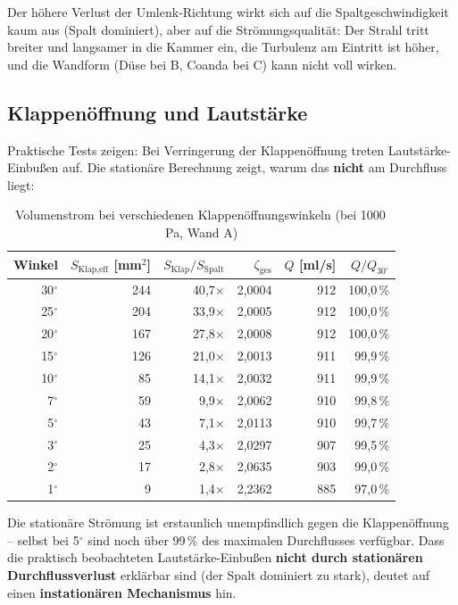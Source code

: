 \documentclass[11pt,a4paper]{article}
\begin{document}
Der höhere Verlust der Umlenk-Richtung wirkt sich auf die Spaltgeschwindigkeit kaum aus (Spalt dominiert), aber auf die Strömungsqualität: Der Strahl tritt breiter und langsamer in die Kammer ein, die Turbulenz am Eintritt ist höher, und die Wandform (Düse bei B, Coanda bei C) kann nicht voll wirken.

\subsection{Klappenöffnung und Lautstärke}

Praktische Tests zeigen: Bei Verringerung der Klappenöffnung treten Lautstärke-Einbußen auf. Die stationäre Berechnung zeigt, warum das \textbf{nicht} am Durchfluss liegt:

\begin{table}[H]
\centering\small
\begin{tabular}{r r r r r r}
\toprule
\textbf{Winkel} & $S_\text{Klap,eff}$ [mm$^2$] & $S_\text{Klap}/S_\text{Spalt}$ & $\zeta_\text{ges}$ & $Q$ [ml/s] & $Q/Q_{30^\circ}$ \\
\midrule
30${}^\circ$ & 244 & 40{,}7$\times$ & 2{,}0004 & 912 & 100{,}0\,\% \\
25${}^\circ$ & 204 & 33{,}9$\times$ & 2{,}0005 & 912 & 100{,}0\,\% \\
20${}^\circ$ & 167 & 27{,}8$\times$ & 2{,}0008 & 912 & 100{,}0\,\% \\
15${}^\circ$ & 126 & 21{,}0$\times$ & 2{,}0013 & 911 & 99{,}9\,\% \\
10${}^\circ$ & 85 & 14{,}1$\times$ & 2{,}0032 & 911 & 99{,}9\,\% \\
7${}^\circ$ & 59 & 9{,}9$\times$ & 2{,}0062 & 910 & 99{,}8\,\% \\
5${}^\circ$ & 43 & 7{,}1$\times$ & 2{,}0113 & 910 & 99{,}7\,\% \\
3${}^\circ$ & 25 & 4{,}3$\times$ & 2{,}0297 & 907 & 99{,}5\,\% \\
2${}^\circ$ & 17 & 2{,}8$\times$ & 2{,}0635 & 903 & 99{,}0\,\% \\
1${}^\circ$ & 9 & 1{,}4$\times$ & 2{,}2362 & 885 & 97{,}0\,\% \\
\bottomrule
\end{tabular}
\caption{Volumenstrom bei verschiedenen Klappenöffnungswinkeln (bei 1000\,Pa, Wand A)}
\end{table}

\begin{warnbox}
Die stationäre Strömung ist erstaunlich unempfindlich gegen die Klappenöffnung -- selbst bei 5${}^\circ$ sind noch über 99\,\% des maximalen Durchflusses verfügbar. Dass die praktisch beobachteten Lautstärke-Einbußen \textbf{nicht durch stationären Durchflussverlust} erklärbar sind (der Spalt dominiert zu stark), deutet auf einen \textbf{instationären Mechanismus} hin.
\end{warnbox}
\end{document}
